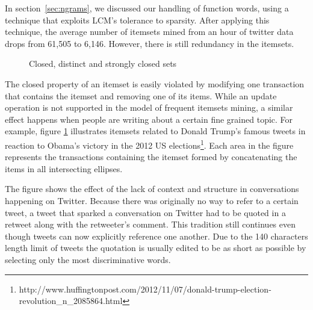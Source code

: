 \documentclass[letterpaper,12pt,titlepage,oneside,final]{book}
\begin{document}
In section~\ref{sec:ngrams}, we discussed our handling of function words,
using a technique that exploits LCM's tolerance to sparsity.
After applying this technique, the average number of itemsets mined from an
hour of twitter data drops from 61,505 to 6,146.
However, there is still redundancy in the itemsets.


\begin{figure}
\centering
{}
\caption{Closed, distinct and strongly closed sets}
\label{fig:sham}
\end{figure}


The closed property of an itemset is easily violated by modifying one
transaction that contains the itemset and removing one of its items.
While an update operation is not supported in the model of frequent itemsets
mining, a similar effect happens when people are writing about a certain fine
grained topic.
For example, figure \ref{fig:sham} illustrates  itemsets related to Donald
Trump's famous tweets in reaction to Obama's victory in the
2012 US elections\footnote{http://www.huffingtonpost.com/2012/11/07/donald-trump-election-revolution\_n\_2085864.html}.  
Each area in the figure represents the transactions containing the itemset
formed by concatenating the items in all intersecting ellipses.  

The figure shows the effect of the lack of context and structure in
conversations happening on Twitter.
Because there was originally no way to refer to a certain tweet,
a tweet that sparked a conversation on Twitter had to be quoted in a retweet
along with the retweeter's comment.
This tradition still continues even though tweets can now explicitly reference
one another. 
Due to the 140 characters length limit of tweets the quotation is usually 
edited to be as short as possible by selecting only the most discriminative
words. 
\end{document}

